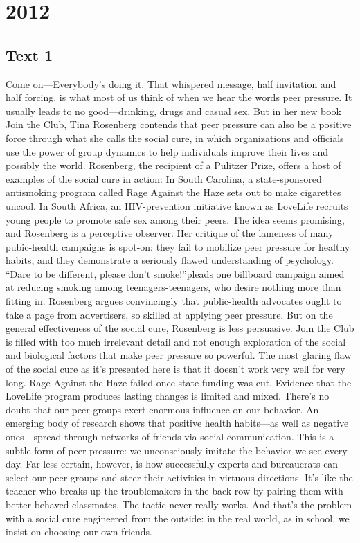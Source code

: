 \section{2012}
\subsection{Text 1}
Come on—Everybody’s doing it. That whispered message, half invitation and half forcing, is what most of us think of when we hear the words peer pressure. It usually leads to no good—drinking, drugs and casual sex. But in her new book Join the Club, Tina Rosenberg contends that peer pressure can also be a positive force through what she calls the social cure, in which organizations and officials use the power of group dynamics to help individuals improve their lives and possibly the world.
Rosenberg, the recipient of a Pulitzer Prize, offers a host of examples of the social cure in action: In South Carolina, a state-sponsored antismoking program called Rage Against the Haze sets out to make cigarettes uncool. In South Africa, an HIV-prevention initiative known as LoveLife recruits young people to promote safe sex among their peers.
The idea seems promising, and Rosenberg is a perceptive observer. Her critique of the lameness of many pubic-health campaigns is spot-on: they fail to mobilize peer pressure for healthy habits, and they demonstrate a seriously flawed understanding of psychology. “Dare to be different, please don’t smoke!”pleads one billboard campaign aimed at reducing smoking among teenagers-teenagers, who desire nothing more than fitting in. Rosenberg argues convincingly that public-health advocates ought to take a page from advertisers, so skilled at applying peer pressure. 
But on the general effectiveness of the social cure, Rosenberg is less persuasive. Join the Club is filled with too much irrelevant detail and not enough exploration of the social and biological factors that make peer pressure so powerful. The most glaring flaw of the social cure as it’s presented here is that it doesn’t work very well for very long. Rage Against the Haze failed once state funding was cut. Evidence that the LoveLife program produces lasting changes is limited and mixed.
There’s no doubt that our peer groups exert enormous influence on our behavior. An emerging body of research shows that positive health habits—as well as negative ones—spread through networks of friends via social communication. This is a subtle form of peer pressure: we  unconsciously imitate the behavior we see every day.
Far less certain, however, is how successfully experts and bureaucrats can select our peer  groups and steer their activities in virtuous directions. It’s like the teacher who breaks up the  troublemakers in the back row by pairing them with better-behaved classmates. The tactic never  really works. And that’s the problem with a social cure engineered from the outside: in the real  world, as in school, we insist on choosing our own friends.

